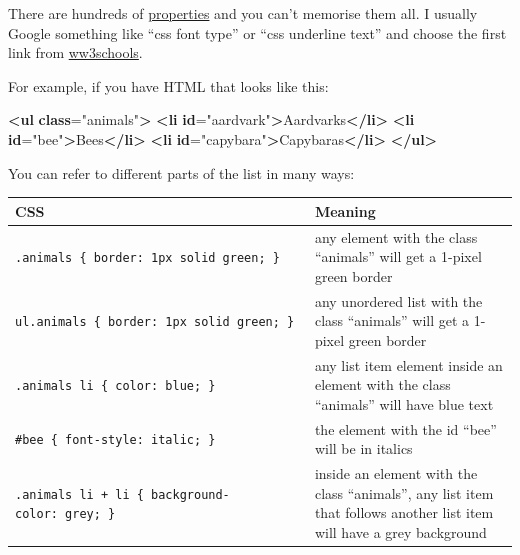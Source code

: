 \documentclass[
]{book}
\newenvironment{Shaded}{\begin{snugshade}}{\end{snugshade}}
\newcommand{\ErrorTok}[1]{\textcolor[rgb]{0.64,0.00,0.00}{\textbf{#1}}}
\newcommand{\KeywordTok}[1]{\textcolor[rgb]{0.13,0.29,0.53}{\textbf{#1}}}
\newcommand{\NormalTok}[1]{#1}
\newcommand{\OtherTok}[1]{\textcolor[rgb]{0.56,0.35,0.01}{#1}}
\newcommand{\StringTok}[1]{\textcolor[rgb]{0.31,0.60,0.02}{#1}}
\begin{document}
There are hundreds of \href{https://www.w3schools.com/cssref/default.asp}{properties} and you can't memorise them all. I usually Google something like ``css font type'' or ``css underline text'' and choose the first link from \href{https://www.w3schools.com}{ww3schools}.

For example, if you have HTML that looks like this:

\begin{Shaded}
\begin{Highlighting}[]
\KeywordTok{\textless{}ul} \ErrorTok{class}\OtherTok{=}\StringTok{"animals"}\KeywordTok{\textgreater{}}
    \KeywordTok{\textless{}li} \ErrorTok{id}\OtherTok{=}\StringTok{"aardvark"}\KeywordTok{\textgreater{}}\NormalTok{Aardvarks}\KeywordTok{\textless{}/li\textgreater{}}
    \KeywordTok{\textless{}li} \ErrorTok{id}\OtherTok{=}\StringTok{"bee"}\KeywordTok{\textgreater{}}\NormalTok{Bees}\KeywordTok{\textless{}/li\textgreater{}}
    \KeywordTok{\textless{}li} \ErrorTok{id}\OtherTok{=}\StringTok{"capybara"}\KeywordTok{\textgreater{}}\NormalTok{Capybaras}\KeywordTok{\textless{}/li\textgreater{}}
\KeywordTok{\textless{}/ul\textgreater{}}
\end{Highlighting}
\end{Shaded}

You can refer to different parts of the list in many ways:

\begin{longtable}[]{@{}
  >{\raggedright\arraybackslash}p{}
  >{\raggedright\arraybackslash}p{}@{}}
\toprule
CSS & Meaning \\
\midrule
\endhead
\texttt{.animals\ \{\ border:\ 1px\ solid\ green;\ \}} & any element with the class ``animals'' will get a 1-pixel green border \\
\texttt{ul.animals\ \{\ border:\ 1px\ solid\ green;\ \}} & any unordered list with the class ``animals'' will get a 1-pixel green border \\
\texttt{.animals\ li\ \{\ color:\ blue;\ \}} & any list item element inside an element with the class ``animals'' will have blue text \\
\texttt{\#bee\ \{\ font-style:\ italic;\ \}} & the element with the id ``bee'' will be in italics \\
\texttt{.animals\ li\ +\ li\ \{\ background-color:\ grey;\ \}} & inside an element with the class ``animals'', any list item that follows another list item will have a grey background \\
\bottomrule
\end{longtable}
\end{document}
